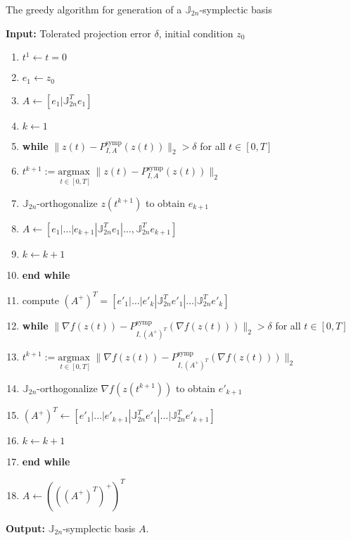 \begin{algorithm} 
\caption{The greedy algorithm for generation of a $\mathbb J_{2n}$-symplectic basis} \label{alg:1}
{\bf Input:} Tolerated projection error $\delta$, initial condition $ z_0$
\begin{enumerate}
\item $t^1 \leftarrow t=0$
\item $e_1 \leftarrow z_0$
\item $A \leftarrow [e_1|\mathbb J^T_{2n}e_1]$
\item $k \leftarrow 1$
\item \textbf{while} $\| z(t) - P^\text{symp}_{I,A}( z(t) ) \|_2 > \delta$ for all $t \in [0,T]$
\item \hspace{0.5cm} $t^{k+1} := \underset{t\in [0,T]}{\text{argmax }} \| z(t) - P^\text{symp}_{I,A}( z(t) ) \|_2$
\item \hspace{0.5cm} $\mathbb J_{2n}$-orthogonalize $ z(t^{k+1})$ to obtain $e_{k+1}$
\item \hspace{0.5cm} $A \leftarrow [e_1|\dots |e_{k+1} | \mathbb J^T_{2n}e_1|\dots,\mathbb J^T_{2n}e_{k+1}]$
\item \hspace{0.5cm} $k \leftarrow k+1$
\item \textbf{end while}
\item compute $(A^+)^T=[e'_1|\dots|e'_k|\mathbb J^T_{2n}e'_1|\dots|\mathbb J^T_{2n}e'_k]$
\item \textbf{while} $\| \nabla f(z(t)) - P^\text{symp}_{I,(A^+)^T}(\nabla f (z(t))) \|_2 > \delta$ for all $t \in [0,T]$
\item \hspace{0.5cm} $t^{k+1} := \underset{t\in [0,T]}{\text{argmax }} \| \nabla f(z(t)) - P^\text{symp}_{I,(A^+)^T}(\nabla f (z(t))) \|_2$
\item \hspace{0.5cm} $\mathbb J_{2n}$-orthogonalize $\nabla f (z(t^{k+1}))$ to obtain $e'_{k+1}$
\item \hspace{0.5cm} $(A^+)^T \leftarrow [e'_1|\dots |e'_{k+1} | \mathbb J^T_{2n}e'_1|\dots|\mathbb J^T_{2n}e'_{k+1}]$
\item \hspace{0.5cm} $k \leftarrow k+1$
\item \textbf{end while}
\item $A \leftarrow \left( \left( \left( A^+\right) ^T \right ) ^+ \right)^T$
\end{enumerate}
\vspace{0.5cm}
{\bf Output:} $\mathbb J_{2n}$-symplectic basis $A$.
\end{algorithm}
